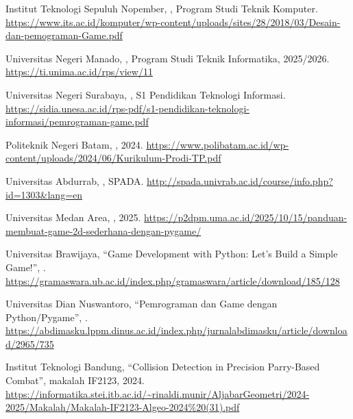 \begin{sloppypar}
\begin{enumerate}[label={[R\arabic*]}, leftmargin=3.2em, itemsep=4pt, topsep=4pt, start=15]
  \item Institut Teknologi Sepuluh Nopember, , Program Studi Teknik Komputer.
        \url{https://www.its.ac.id/komputer/wp-content/uploads/sites/28/2018/03/Desain-dan-pemograman-Game.pdf}

  \item Universitas Negeri Manado, , Program
        Studi Teknik Informatika, 2025/2026.
        \url{https://ti.unima.ac.id/rps/view/11}

  \item Universitas Negeri Surabaya, , S1
        Pendidikan Teknologi Informasi.
        \url{https://sidia.unesa.ac.id/rps-pdf/s1-pendidikan-teknologi-informasi/pemrograman-game.pdf}

  \item Politeknik Negeri Batam, , 2024.
        \url{https://www.polibatam.ac.id/wp-content/uploads/2024/06/Kurikulum-Prodi-TP.pdf}

  \item Universitas Abdurrab, ,
        SPADA. \url{http://spada.univrab.ac.id/course/info.php?id=1303&lang=en}

  \item Universitas Medan Area, , 2025.
        \url{https://p2dpm.uma.ac.id/2025/10/15/panduan-membuat-game-2d-sederhana-dengan-pygame/}

  \item Universitas Brawijaya, ``Game Development with Python: Let's Build a
        Simple Game!'', .
        \url{https://gramaswara.ub.ac.id/index.php/gramaswara/article/download/185/128}

  \item Universitas Dian Nuswantoro, ``Pemrograman dan Game dengan
        Python/Pygame'', .
        \url{https://abdimasku.lppm.dinus.ac.id/index.php/jurnalabdimasku/article/download/2965/735}

  \item Institut Teknologi Bandung, ``Collision Detection in Precision
        Parry-Based Combat'', makalah IF2123, 2024.
        \url{https://informatika.stei.itb.ac.id/~rinaldi.munir/AljabarGeometri/2024-2025/Makalah/Makalah-IF2123-Algeo-2024%20(31).pdf}


\end{enumerate}
\end{sloppypar}
